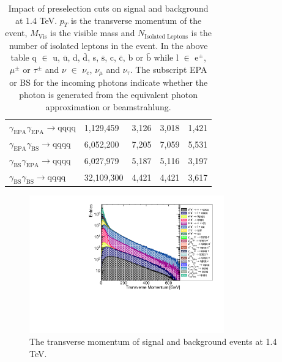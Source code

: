 \begin{table}[h!]
\begin{tabular}{ l l l l l}
$\gamma_{\text{EPA}}\gamma_{\text{EPA}} \rightarrow \text{qqqq}$ & 1,129,459 & 3,126 & 3,018 & 1,421 \\
$\gamma_{\text{EPA}}\gamma_{\text{BS}} \rightarrow \text{qqqq}$ & 6,052,200 & 7,205 & 7,059 & 5,531 \\
$\gamma_{\text{BS}}\gamma_{\text{EPA}} \rightarrow \text{qqqq}$ & 6,027,979 & 5,187 & 5,116 & 3,197 \\
$\gamma_{\text{BS}}\gamma_{\text{BS}} \rightarrow \text{qqqq}$ & 32,109,300 & 4,421 & 4,421 & 3,617 \\
\hline
\end{tabular}
\caption[Impact of preselection cuts on signal and background at 1.4 TeV.]{Impact of preselection cuts on signal and background at 1.4 TeV.  $p_{T}$ is the transverse momentum of the event,  $M_{\text{Vis}}$ is the visible mass and $N_{\text{Isolated Leptons}}$ is the number of isolated leptons in the event.  In the above table q $\in$ u, $\bar{\text{u}}$, d, $\bar{\text{d}}$, s, $\bar{\text{s}}$, c, $\bar{\text{c}}$, b or $\bar{\text{b}}$ while l $\in$ $\text{e}^{\pm}$, $\mu^{\pm}$ or $\tau^{\pm}$ and $\nu$ $\in$ $\nu_{e}$, $\nu_{\mu}$ and $\nu_{\tau}$.  The subscript EPA or BS for the incoming photons indicate whether the photon is generated from the equivalent photon approximation or beamstrahlung.}
\label{table:cutflow1400GeV}
\end{table}

\begin{figure}
\centering
\includegraphics[width=0.75\textwidth]{PhysicsAnalysis/Plots/PreSelection/1400GeV/TransverseMomentum.pdf}
\caption[Transverse momentum at 1.4 TeV.]{The transverse momentum of signal and background events at 1.4 TeV.}
\label{fig:preselection1}
\end{figure}

